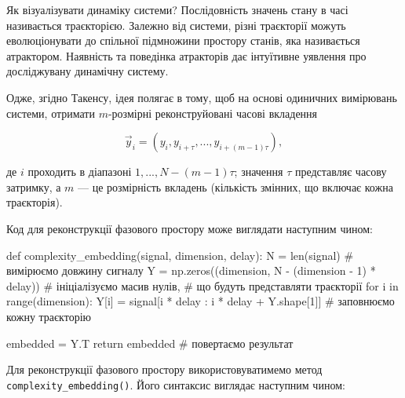 \documentclass[
  letterpaper,
]{report}
\newenvironment{Shaded}{\begin{snugshade}}{\end{snugshade}}
\newcommand{\BuiltInTok}[1]{\textcolor[rgb]{0.00,0.23,0.31}{#1}}
\newcommand{\CommentTok}[1]{\textcolor[rgb]{0.37,0.37,0.37}{#1}}
\newcommand{\ControlFlowTok}[1]{\textcolor[rgb]{0.00,0.23,0.31}{#1}}
\newcommand{\DecValTok}[1]{\textcolor[rgb]{0.68,0.00,0.00}{#1}}
\newcommand{\KeywordTok}[1]{\textcolor[rgb]{0.00,0.23,0.31}{#1}}
\newcommand{\NormalTok}[1]{\textcolor[rgb]{0.00,0.23,0.31}{#1}}
\newcommand{\OperatorTok}[1]{\textcolor[rgb]{0.37,0.37,0.37}{#1}}
\begin{document}
Як візуалізувати динаміку системи? Послідовність значень стану в часі
називається траєкторією. Залежно від системи, різні траєкторії можуть
еволюціонувати до спільної підмножини простору станів, яка називається
атрактором. Наявність та поведінка атракторів дає інтуїтивне уявлення
про досліджувану динамічну систему.

Одже, згідно Такенсу, ідея полягає в тому, щоб на основі одиничних
вимірювань системи, отримати \(m\)-розмірні реконструйовані часові
вкладення

\[
    \vec{y}_i = \left( y_i, y_{i+\tau}, ... , y_{i+(m-1)\tau} \right), \tag{1}
\]

де \(i\) проходить в діапазоні \(1,..., N-(m-1)\tau\); значення \(\tau\)
представляє часову затримку, а \(m\) --- це розмірність вкладень
(кількість змінних, що включає кожна траєкторія).

Код для реконструкції фазового простору може виглядати наступним чином:

\begin{Shaded}
\begin{Highlighting}[]
\KeywordTok{def}\NormalTok{ complexity\_embedding(signal, dimension, delay):}
\NormalTok{    N }\OperatorTok{=} \BuiltInTok{len}\NormalTok{(signal)                                        }\CommentTok{\# вимірюємо довжину сигналу}
\NormalTok{    Y }\OperatorTok{=}\NormalTok{ np.zeros((dimension, N }\OperatorTok{{-}}\NormalTok{ (dimension }\OperatorTok{{-}} \DecValTok{1}\NormalTok{) }\OperatorTok{*}\NormalTok{ delay)) }\CommentTok{\# ініціалізуємо масив нулів,}
                                                           \CommentTok{\# що будуть представляти траєкторії}
    \ControlFlowTok{for}\NormalTok{ i }\KeywordTok{in} \BuiltInTok{range}\NormalTok{(dimension):}
\NormalTok{        Y[i] }\OperatorTok{=}\NormalTok{ signal[i }\OperatorTok{*}\NormalTok{ delay : i }\OperatorTok{*}\NormalTok{ delay }\OperatorTok{+}\NormalTok{ Y.shape[}\DecValTok{1}\NormalTok{]]  }\CommentTok{\# заповнюємо кожну траєкторію }

\NormalTok{    embedded }\OperatorTok{=}\NormalTok{ Y.T                                          }
    \ControlFlowTok{return}\NormalTok{ embedded                                        }\CommentTok{\# повертаємо результат }
\end{Highlighting}
\end{Shaded}

Для реконструкції фазового простору використовуватимемо метод
\texttt{complexity\_embedding()}. Його синтаксис виглядає наступним
чином:
\end{document}
